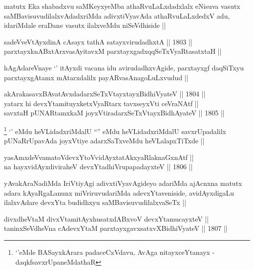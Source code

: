 \begin{artha}
matutx Eka shabadxvu saMKeyxyeMba athaRvuLaLxdadxlalx eNisuva vasutx
saMBavisuvudilalxvAdadxriMda adivxtiVyavAda athaRvuLaLxdedxV adu,
idariMdale eraDane vasutx ilalxveMdu niSeVdhiside ||
\end{artha}

\begin{shl}
sadeVveVtAyxdinA cAsayx tathA satayxvirudadhxtA ||  1803 ||  \\
parxtayxknABxtArxvasAyitavxM parxtayxgadxqqSeTxVyaRtasatxtaH ||
\end{shl}

\begin{artha}
hAgAdareVnaye `\stext' itAyxdi vacana idu avirudadhxvAgide, parxtayxgf
daqSiTxyu parxtayxgAtamx mAtarxdalilx payARvasAnagoLuLxvudud ||
\end{artha}

\begin{shl}
akArakasavxBAvatAvxdadarxSeTxVtayxtayxBidhiVyateV ||  1804 ||  \\
yatarx hi devxYtamituyxketxVyaRtarx tavxseyxVti ceVraNAtf || \\
savxtaH pUNARtamxkaM joyxVtiradarxSeTxVtayxBidhAyateV ||  1805 ||  
\end{shl}

\begin{artha}
\footnote[1]{`\stext'eMde BASayxkArara padaceCxVdavu, AvAga
  nitayxceYtanayx - daqkfsavxrUpaneMdathaR}
`\stext' eMdu heVLidadxriMdalU ``\stext'' eMdu heVLidadxriMdalU
  savxrUpadalilx pUNaRrUpavAda joyxVtiye adarxSaTxveMdu
  heVLalapxTiTxde ||
\end{artha}


\begin{shl}
yasAmxdeVvamatoV\s devxYtoV\s vidAyxtatAkxyaRlaknaGxnAtf || \\
na hayxvidAyxdiviraheV devxYtadhiVrupapadayxteV ||  1806 ||  
\end{shl}

\begin{artha}
yAvakAraNadiMda IriVtiyAgi adivxtiVyavAgideyo adariMda ajAcnxna matutx
adara kAyaRgaLanunx miVriruvudariMda adevxYtaveniside, avidAyxdigaLu
ilalxvAdare devxYta budidhxyu saMBavisuvudilalxvaSeTx ||
\end{artha}


\begin{shl}
divxdheVtaM divxVtamitAyxhusatxdABxvoV devxYtamucayxteV || \\
taninxSeVdheVna cAdevxYtaM parxtayxgavxsatxvXBidhiVyateV ||  1807 ||  
\end{shl}

